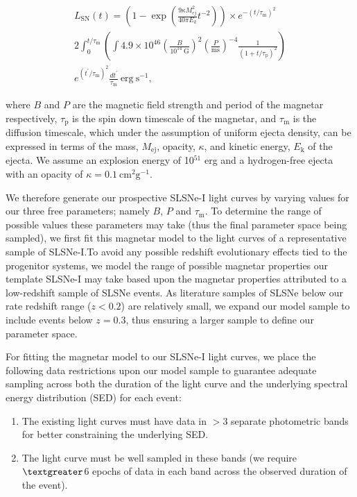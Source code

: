 \documentclass[a4paper,fleqn,usenatbib]{mnras}
\begin{document}
\begin{multline}
L_{\mathrm{SN}}\left ( t \right )= \left(1- \exp{\left(\frac{9\kappa M_{ej}^{2}}{40\pi E_{k}}t^{-2} \right)}\right)\times e^{-(t/\tau_{\mathrm{m}})^{2}} \\ 2\int_{0}^{t/\tau_{\mathrm{m}}}
\left(\int 4.9\times10^{46} \left(\frac{B}{10^{14}~\mathrm{G}} \right)^{2}\left(\frac{P}{\mathrm{ms}} \right)^{-4} \frac{1}{(1 + t/\tau_{\mathrm{p}})^{2}}\right ) \\ e^{(t^{\prime}/\tau_{\mathrm{m}})^{2}}\frac{dt^{\prime}}{\tau_{\mathrm{m}}} \mathrm{~ erg~ s^{-1}},
\label{equation_magnetar}
\end{multline}

where $B$ and $P$ are the magnetic field strength and period of the magnetar respectively, $\tau_{\mathrm{p}}$ is the spin down timescale of the magnetar, and $\tau_{\mathrm{m}}$ is the diffusion timescale, which under the assumption of uniform ejecta density, can be expressed in terms of the mass, $M_{\mathrm{ej}}$, opacity, $\kappa$, and kinetic energy, $E_{\mathrm{k}}$ of the ejecta. We assume an explosion energy of 10$^{51}$ erg and a hydrogen-free ejecta with an opacity of $\kappa = 0.1~\mathrm{cm}^{2} \mathrm{g}^{-1}$. 

We therefore generate our prospective SLSNe-I light curves by varying values for our three free parameters; namely $B$, $P$ and $\tau_{\mathrm{m}}$. To determine the range of possible values these parameters may take (thus the final parameter space being sampled), we first fit this magnetar model to the light curves of a representative sample of SLSNe-I.To avoid any possible redshift evolutionary effects tied to the progenitor systems, we model the range of possible magnetar properties our template SLSNe-I may take based upon the magnetar properties attributed to a low-redshift sample of SLSNe events. As literature samples of SLSNe below our rate redshift range ($z<0.2$) are relatively small, we expand our model sample to include events below $z=0.3$, thus ensuring a larger sample to define our parameter space. 

For fitting the magnetar model to our SLSNe-I light curves, we place the following data restrictions upon our model sample to guarantee adequate sampling across both the duration of the light curve and the underlying spectral energy distribution (SED) for each event:
\begin{enumerate}
    \item The existing light curves must have data in $>$3 separate photometric bands for better constraining the underlying SED.
    \item The light curve must be well sampled in these bands (we require $\textgreater$6 epochs of data in each band across the observed duration of the event).
\end{enumerate}
\end{document}
